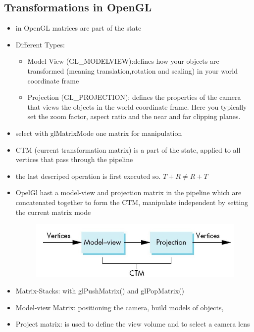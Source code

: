 \documentclass[11pt,a4paper]{article}
\begin{document}
	\subsection{Transformations in OpenGL}
	\begin{itemize}	
		\item in OpenGL matrices are part of the state
		\item Different Types:
		\begin{itemize}
			\item Model-View (GL\_MODELVIEW):defines how your objects are transformed (meaning translation,rotation and scaling) in your world coordinate frame
			\item Projection (GL\_PROJECTION): defines the properties of the camera that views the objects in the world coordinate frame. Here you typically set the zoom factor, aspect ratio and the near and far clipping planes.
		\end{itemize}
		\item select with glMatrixMode one matrix for manipulation
		\item CTM (current transformation matrix) is a part of the state, applied to all vertices that pass through the pipeline
		\item the last descriped operation is first executed so. $T+R \neq R+T$
		\item OpelGl hast a model-view and projection matrix in the pipeline which are concatenated together to form the CTM, manipulate independent by setting the current matrix mode 
		\begin{figure}[h]
			\hspace{2.0cm}
			\vspace{-0.6cm}
			\includegraphics[scale=0.4]{pictures/CTM.jpg}
		\end{figure}
		\item Matrix-Stacks: with glPushMatrix() and glPopMatrix()
		\item Model-view Matrix: positioning the camera, build models of objects,
		\item Project matrix: is used to define the view volume and to select a camera lens
	\end{itemize}
\end{document}
